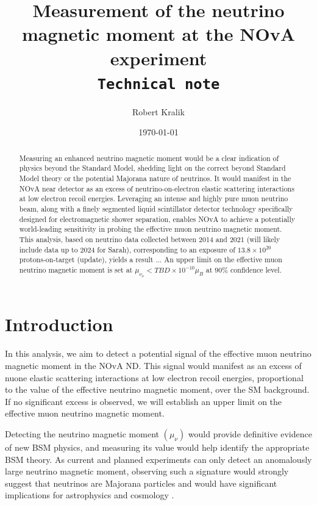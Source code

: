 \documentclass[12pt]{article}
\title{Measurement of the neutrino magnetic moment at the NOvA experiment\\ \vspace*{1cm} \texttt{Technical note}}
\author[1]{Robert Kralik}
\affil[1]{University of Sussex, Brighton, UK}
\date{\today}
\begin{document}
\maketitle
{}


\begin{abstract}
Measuring an enhanced neutrino magnetic moment would be a clear indication of physics beyond the Standard Model, shedding light on the correct beyond Standard Model theory or the potential Majorana nature of neutrinos. It would manifest in the NOvA near detector as an excess of neutrino-on-electron elastic scattering interactions at low electron recoil energies. Leveraging an intense and highly pure muon neutrino beam, along with a finely segmented liquid scintillator detector technology specifically designed for electromagnetic shower separation, enables NOvA to achieve a potentially world-leading sensitivity in probing the effective muon neutrino magnetic moment. This analysis, based on neutrino data collected between 2014 and 2021 (will likely include data up to 2024 for Sarah), corresponding to an exposure of $13.8\times10^{20}$ protons-on-target (update), yields a result ... An upper limit on the effective muon neutrino magnetic moment is set at $\mu_{\nu_\mu}<TBD\times 10^{-10}\mu_B$ at $90\%$ confidence level.
\end{abstract}
\newpage
\tableofcontents

\newpage
{}
\setcounter{page}{1}

\section{Introduction}

In this analysis, we aim to detect a potential signal of the effective muon neutrino magnetic moment in the \gls{NOvA} \gls{ND}. This signal would manifest as an excess of \gls{nuone} elastic scattering interactions at low electron recoil energies, proportional to the value of the effective neutrino magnetic moment, over the \gls{SM} background. If no significant excess is observed, we will establish an upper limit on the effective muon neutrino magnetic moment.

Detecting the neutrino magnetic moment $\left(\mu_\nu\right)$ would provide definitive evidence of new \gls{BSM} physics, and measuring its value would help identify the appropriate \gls{BSM} theory. As current and planned experiments can only detect an anomalously large neutrino magnetic moment, observing such a signature would strongly suggest that neutrinos are Majorana particles and would have significant implications for astrophysics and cosmology \cite{SnowmassNeutrinoFrontierReport.pdf}.
\end{document}

